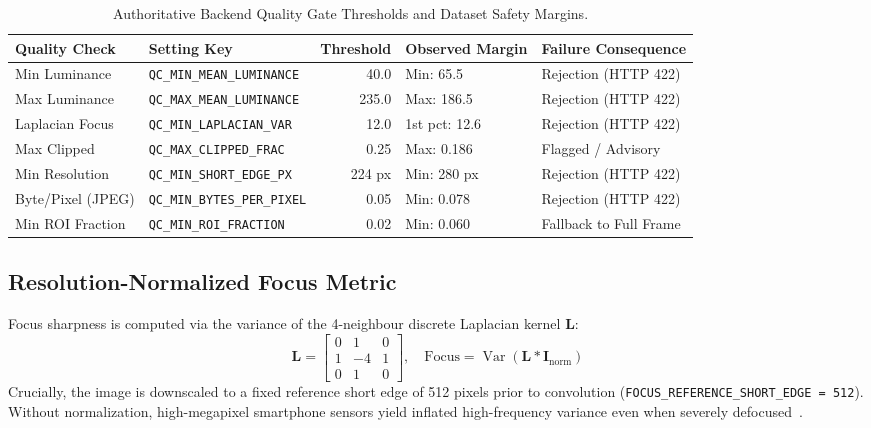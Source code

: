 \documentclass[11pt,a4paper]{report}
\newcommand{\keypath}[1]{\nolinkurl{#1}}
\begin{document}
\begin{table}[H]
\centering
\footnotesize
\setlength{\tabcolsep}{3pt}
\begin{tabularx}{\textwidth}{l >{\raggedright\arraybackslash\tiny}X r l >{\raggedright\arraybackslash}p{3.8cm}}
\toprule
\textbf{Quality Check} & \textbf{Setting Key} & \textbf{Threshold} & \textbf{Observed Margin} & \textbf{Failure Consequence} \\
\midrule
Min Luminance & \keypath{QC_MIN_MEAN_LUMINANCE} & 40.0 & Min: 65.5 & Rejection (HTTP 422) \\
Max Luminance & \keypath{QC_MAX_MEAN_LUMINANCE} & 235.0 & Max: 186.5 & Rejection (HTTP 422) \\
Laplacian Focus & \keypath{QC_MIN_LAPLACIAN_VAR} & 12.0 & 1st pct: 12.6 & Rejection (HTTP 422) \\
Max Clipped & \keypath{QC_MAX_CLIPPED_FRAC} & 0.25 & Max: 0.186 & Flagged / Advisory \\
Min Resolution & \keypath{QC_MIN_SHORT_EDGE_PX} & 224 px & Min: 280 px & Rejection (HTTP 422) \\
Byte/Pixel (JPEG) & \keypath{QC_MIN_BYTES_PER_PIXEL}& 0.05 & Min: 0.078 & Rejection (HTTP 422) \\
Min ROI Fraction & \keypath{QC_MIN_ROI_FRACTION} & 0.02 & Min: 0.060 & Fallback to Full Frame \\
\bottomrule
\end{tabularx}
\caption{Authoritative Backend Quality Gate Thresholds and Dataset Safety Margins.}
\label{tab:qc_thresholds}
\end{table}

\subsection{Resolution-Normalized Focus Metric}
Focus sharpness is computed via the variance of the 4-neighbour discrete Laplacian kernel $\mathbf{L}$:
\begin{equation}
  \mathbf{L} = \begin{bmatrix} 0 & 1 & 0 \\ 1 & -4 & 1 \\ 0 & 1 & 0 \end{bmatrix}, \quad \text{Focus} = \operatorname{Var}\left( \mathbf{L} * \mathbf{I}_\text{norm} \right)
\end{equation}
Crucially, the image is downscaled to a fixed reference short edge of 512 pixels prior to convolution (\texttt{FOCUS\_REFERENCE\_SHORT\_EDGE = 512}). Without normalization, high-megapixel smartphone sensors yield inflated high-frequency variance even when severely defocused~\cite{pechpacheco2000diatom}.
\end{document}
